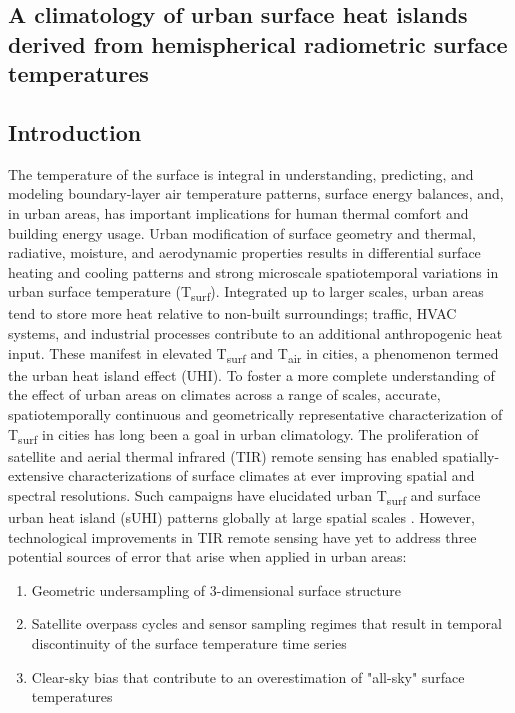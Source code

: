 \begin{bibunit}

\rhead{\thepage}

\chapter{A climatology of urban surface heat islands derived from hemispherical radiometric surface temperatures}
\label{paper2}

\section{Introduction}

The temperature of the surface is integral in understanding, predicting, and modeling boundary-layer air temperature patterns, surface energy balances, and, in urban areas, has important implications for human thermal comfort and building energy usage. Urban modification of surface geometry and thermal, radiative, moisture, and aerodynamic properties results in differential surface heating and cooling patterns and strong microscale spatiotemporal variations in urban surface temperature (T\textsubscript{surf}). Integrated up to larger scales, urban areas tend to store more heat relative to non-built surroundings; traffic, HVAC systems, and industrial processes contribute to an additional anthropogenic heat input. These manifest in elevated T\textsubscript{surf} and T\textsubscript{air} in cities, a phenomenon termed the urban heat island effect (UHI). To foster a more complete understanding of the effect of urban areas on climates across a range of scales, accurate, spatiotemporally continuous and geometrically representative characterization of T\textsubscript{surf} in cities has long been a goal in urban climatology. The proliferation of satellite and aerial thermal infrared (TIR) remote sensing has enabled spatially-extensive characterizations of surface climates at ever improving spatial and spectral resolutions. Such campaigns have elucidated urban T\textsubscript{surf} and surface urban heat island (sUHI) patterns globally at large spatial scales \cite{Peng2012,Zhao2014}. However, technological improvements in TIR remote sensing have yet to address three potential sources of error that arise when applied in urban areas: 

\begin{enumerate}
	\item Geometric undersampling of 3-dimensional surface structure
	\item Satellite overpass cycles and sensor sampling regimes that result in temporal discontinuity of the surface temperature time series
	\item Clear-sky bias that contribute to an overestimation of "all-sky" surface temperatures
\end{enumerate}


\end{bibunit}
